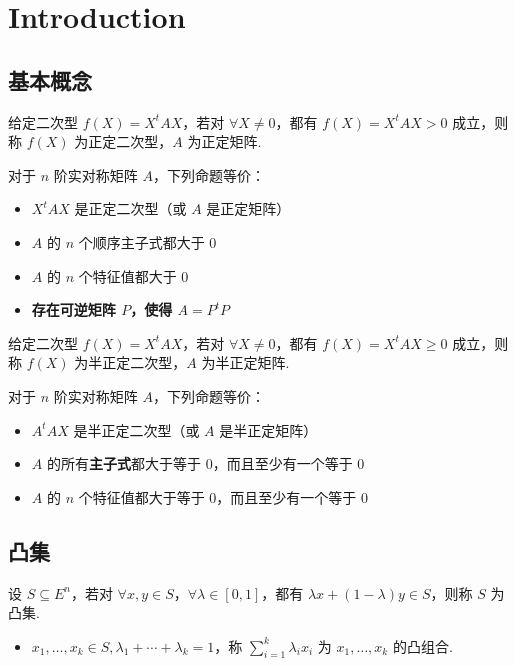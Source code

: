 \section{Introduction}

\subsection{基本概念}
\begin{definition}[二次型的正定性]
    给定二次型 $f(X) = X^t AX$，若对 $\forall X \neq 0$，都有 $f(X) = X^t AX > 0$ 成立，则称 $f(X)$ 为正定二次型，$A$ 为正定矩阵.
\end{definition}

\begin{theorem}
    对于 $n$ 阶实对称矩阵 $A$，下列命题等价：
    \begin{itemize}
        \item $X^t AX$ 是正定二次型（或 $A$ 是正定矩阵）
        \item $A$ 的 $n$ 个顺序主子式都大于 0
        \item $A$ 的 $n$ 个特征值都大于 0
        \item \textbf{存在可逆矩阵 $P$，使得 $A = P^t P$}
    \end{itemize}
\end{theorem}

\begin{definition}[二次型的半正定性]
    给定二次型 $f(X) = X^t AX$，若对 $\forall X \neq 0$，都有 $f(X) = X^t AX \ge 0$ 成立，则称 $f(X)$ 为半正定二次型，$A$ 为半正定矩阵.
\end{definition}

\begin{theorem}
    对于 $n$ 阶实对称矩阵 $A$，下列命题等价：
    \begin{itemize}
        \item $A^t AX$ 是半正定二次型（或 $A$ 是半正定矩阵）
        \item $A$ 的所有\textbf{主子式}都大于等于 0，而且至少有一个等于 0
        \item $A$ 的 $n$ 个特征值都大于等于 0，而且至少有一个等于 0
    \end{itemize}
\end{theorem}

\subsection{凸集}
\begin{definition}[凸集]
    设 $S \subseteq E^n$，若对 $\forall x, y \in S$，$\forall \lambda \in [0, 1]$，都有 $\lambda x + (1 - \lambda)y \in S$，则称 $S$ 为凸集.
    \begin{itemize}
        \item $x_1, \dots, x_k \in S, \lambda_1 + \cdots + \lambda_k = 1$，称 $\sum_{i = 1}^k \lambda_ix_i$ 为 $x_1, \dots, x_k$ 的凸组合.
    \end{itemize}
\end{definition}


